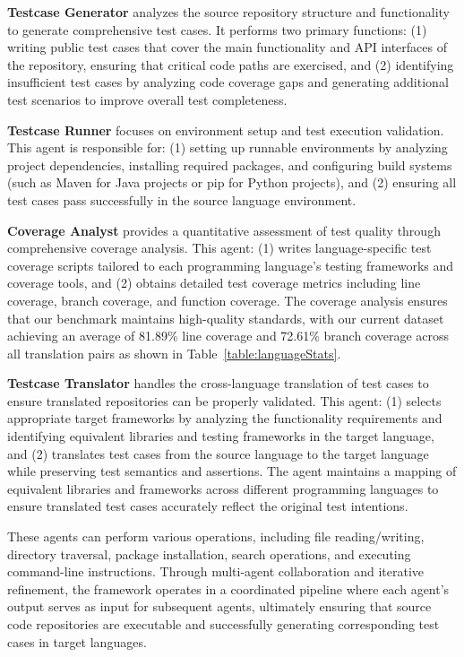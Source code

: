 \textbf{Testcase Generator} analyzes the source repository structure and functionality to generate comprehensive test cases. It performs two primary functions: (1) writing public test cases that cover the main functionality and API interfaces of the repository, ensuring that critical code paths are exercised, and (2) identifying insufficient test cases by analyzing code coverage gaps and generating additional test scenarios to improve overall test completeness.

\textbf{Testcase Runner} focuses on environment setup and test execution validation. This agent is responsible for: (1) setting up runnable environments by analyzing project dependencies, installing required packages, and configuring build systems (such as Maven for Java projects or pip for Python projects), and (2) ensuring all test cases pass successfully in the source language environment. 

\textbf{Coverage Analyst} provides a quantitative assessment of test quality through comprehensive coverage analysis. This agent: (1) writes language-specific test coverage scripts tailored to each programming language's testing frameworks and coverage tools, and (2) obtains detailed test coverage metrics including line coverage, branch coverage, and function coverage. The coverage analysis ensures that our benchmark maintains high-quality standards, with our current dataset achieving an average of 81.89\% line coverage and 72.61\% branch coverage across all translation pairs as shown in Table~\ref{table:languageStats}.

\textbf{Testcase Translator} handles the cross-language translation of test cases to ensure translated repositories can be properly validated. This agent: (1) selects appropriate target frameworks by analyzing the functionality requirements and identifying equivalent libraries and testing frameworks in the target language, and (2) translates test cases from the source language to the target language while preserving test semantics and assertions. The agent maintains a mapping of equivalent libraries and frameworks across different programming languages to ensure translated test cases accurately reflect the original test intentions.

These agents can perform various operations, including file reading/writing, directory traversal, package installation, search operations, and executing command-line instructions. Through multi-agent collaboration and iterative refinement, the framework operates in a coordinated pipeline where each agent's output serves as input for subsequent agents, ultimately ensuring that source code repositories are executable and successfully generating corresponding test cases in target languages.


